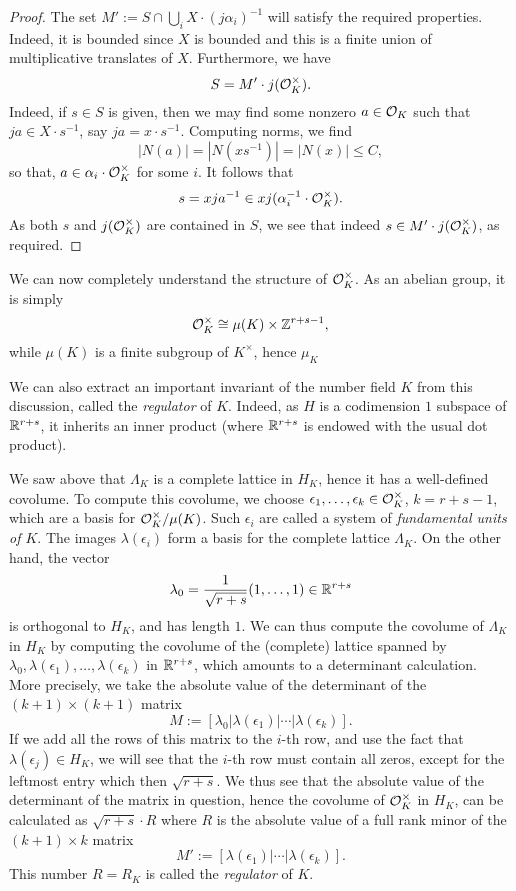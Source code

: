 \begin{proof}
  The set $M' := S \cap \bigcup_{i} X \cdot (j \alpha_{i})^{-1}$ will satisfy the required properties.
  Indeed, it is bounded since $X$ is bounded and this is a finite union of multiplicative translates of $X$.
  Furthermore, we have
  \[ S = M' \cdot j(\mathcal{O}_{K}^{\times}).\]
  Indeed, if $s \in S$ is given, then we may find some nonzero $a \in \mathcal{O}_{K}$ such that $j a \in X \cdot s^{-1}$, say $ja = x \cdot s^{-1}$.
  Computing norms, we find
  \[ |N(a)| = |N(xs^{-1})| = |N(x)| \le C, \]
  so that, $a \in \alpha_{i} \cdot \mathcal{O}_{K}^{\times}$ for some $i$.
  It follows that
  \[ s = x ja^{-1} \in x j(\alpha_{i}^{-1} \cdot \mathcal{O}_{K}^{\times}). \]
  As both $s$ and $j(\mathcal{O}_{K}^{\times})$ are contained in $S$, we see that indeed $s \in M' \cdot j(\mathcal{O}_{K}^{\times})$, as required.
\end{proof}

We can now completely understand the structure of $\mathcal{O}_{K}^{\times}$.
As an abelian group, it is simply
\[ \mathcal{O}_{K}^{\times} \cong \mu(K) \times \mathbb{Z}^{r + s - 1}, \]
while $\mu(K)$ is a finite subgroup of $K^{\times}$, hence $\mu_{K}$ 

We can also extract an important invariant of the number field $K$ from this discussion, called the \emph{regulator} of $K$.
Indeed, as $H$ is a codimension $1$ subspace of $\mathbb{R}^{r+s}$, it inherits an inner product (where $\mathbb{R}^{r+s}$ is endowed with the usual dot product).

We saw above that $\Lambda_{K}$ is a complete lattice in $H_{K}$, hence it has a well-defined covolume.
To compute this covolume, we choose $\epsilon_{1},\ldots,\epsilon_{k} \in \mathcal{O}_{K}^{\times}$, $k = r+s-1$, which are a basis for $\mathcal{O}_{K}^{\times}/\mu(K)$.
Such $\epsilon_{i}$ are called a system of \emph{fundamental units of $K$}.
The images $\lambda(\epsilon_{i})$ form a basis for the complete lattice $\Lambda_{K}$.
On the other hand, the vector
\[ \lambda_{0} = \frac{1}{\sqrt{r+s}}(1,\ldots,1) \in \mathbb{R}^{r+s} \]
is orthogonal to $H_{K}$, and has length $1$.
We can thus compute the covolume of $\Lambda_{K}$ in $H_{K}$ by computing the covolume of the (complete) lattice spanned by $\lambda_{0},\lambda(\epsilon_{1}),\ldots,\lambda(\epsilon_{k})$ in $\mathbb{R}^{r+s}$, which amounts to a determinant calculation.
More precisely, we take the absolute value of the determinant of the $(k+1)\times(k+1)$ matrix
\[ M := [\lambda_{0}|\lambda(\epsilon_{1})|\cdots|\lambda(\epsilon_{k})]. \]
If we add all the rows of this matrix to the $i$-th row, and use the fact that $\lambda(\epsilon_{j}) \in H_{K}$, we will see that the $i$-th row must contain all zeros, except for the leftmost entry which then  $\sqrt{r+s}$.
We thus see that the absolute value of the determinant of the matrix in question, hence the covolume of $\mathcal{O}_{K}^{\times}$ in $H_{K}$, can be calculated as $\sqrt{r+s} \cdot R$ where $R$ is the absolute value of a full rank minor of the $(k+1) \times k$ matrix
\[ M' := [\lambda(\epsilon_{1})|\cdots|\lambda(\epsilon_{k})]. \]
This number $R = R_{K}$ is called the \emph{regulator} of $K$.

